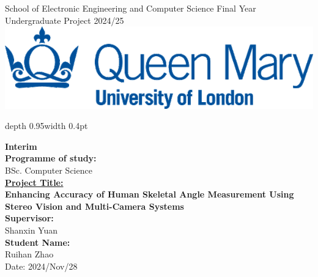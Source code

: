 \documentclass[a4paper,12pt]{article}
\renewcommand{\headrulewidth}{0.4pt}
\renewcommand{\headrulewidth}{0pt}
\newcommand{\removeheaderandfooter}{
  \pagestyle{empty}
  \fancyhead{}
  \fancyfoot{}
  \renewcommand{\headrulewidth}{0pt}
}
\begin{document}

\begin{titlepage}
\removeheaderandfooter
\noindent
\begin{minipage}[t][0.95\textheight][t]{0.48\textwidth}
\raggedright
{\fontsize{15}{18}\selectfont School of Electronic Engineering and Computer Science}
\vfill
{\fontsize{15}{18}\selectfont 
Final Year\\
Undergraduate Project 2024/25
}
\vspace{4em}\\
\includegraphics[width=0.6\linewidth]{qmul_logo.png} %
\end{minipage}
\hfill
\vrule depth 0.95\textheight width 0.4pt
\hfill
\begin{minipage}[t][0.95\textheight][t]{0.48\textwidth}
\raggedright
{\fontsize{14}{17}\selectfont
\textbf{Interim}\\ %
\textbf{Programme of study:}\\
BSc. Computer Science\\[4em]
}
{\fontsize{20}{24}\selectfont \uline{\textbf{Project Title:}}\\
\textbf{Enhancing Accuracy of Human Skeletal Angle Measurement Using Stereo Vision and Multi-Camera Systems}\\[4em]
{\fontsize{14}{17}\selectfont
\textbf{Supervisor:}\\
Shanxin Yuan\\[4em]
\textbf{Student Name:}\\
Ruihan Zhao\\[4em]
\vfill
Date: 2024/Nov/28
}}
\end{minipage}
\end{titlepage}

\setcounter{page}{2}

\clearpage
\removeheaderandfooter


\clearpage
\pagestyle{plain}
\tableofcontents

\clearpage
\pagestyle{main}


\end{document}
